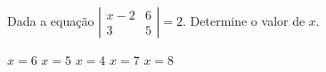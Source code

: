 Dada a equação $\left| \begin{array}{cc}
x-2 & 6 \\
3 & 5
\end{array} \right|=2$. Determine o valor de $x$.

$x=6$
$x=5$
$x=4$
$x=7$
$x=8$


